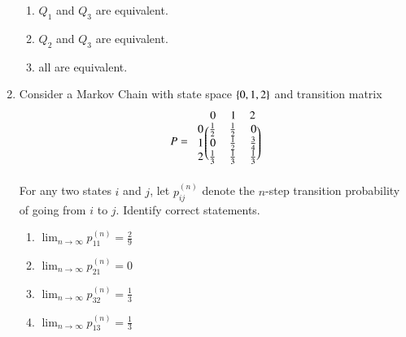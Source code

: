 \begin{enumerate}[label=\thesection.\arabic*.,ref=\thesection.\theenumi]
\begin{enumerate}
\item $Q_1$ and $Q_3$ are equivalent.
\item $Q_2$ and $Q_3$ are equivalent.
\item all are equivalent.
\end{enumerate}
\solution

\item Consider a Markov Chain with state space $\left\{0,1,2\right\}$ and transition matrix
\begin{align}
P = 
\begin{blockarray}{c@{\hspace{1pt}}rrr@{\hspace{3pt}}}
         & 0   & 1   & 2 \\
        \begin{block}{r@{\hspace{3pt}}@{\hspace{1pt}}
    (@{\hspace{1pt}}rrr@{\hspace{1pt}}@{\hspace{1pt}})}
        0 & \frac{1}{2} & \frac{1}{2} & 0  \\
        1 & 0 &\frac{1}{2}  & \frac{3}{4}  \\
%
        2 &  \frac{1}{3} & \frac{1}{3} & \frac{1}{3}  \\
        \end{block}
    \end{blockarray}
\end{align}
For any two states $i$ and $j$, let $p_{ij}^{(n)}$ denote the $n$-step transition probability of going from $i$ to $j$.  Identify correct statements.
\begin{enumerate}
\item $\lim_{n \to \infty} p_{11}^{(n)} = \frac{2}{9}$
\item $\lim_{n \to \infty} p_{21}^{(n)} = 0$
\item $\lim_{n \to \infty} p_{32}^{(n)} = \frac{1}{3}$
\item $\lim_{n \to \infty} p_{13}^{(n)} = \frac{1}{3}$
\end{enumerate}

\end{enumerate}
